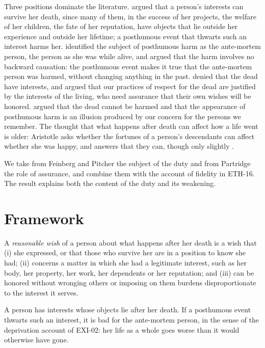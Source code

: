 \documentclass{situationist-preprint}
\begin{document}
Three positions dominate the literature. \citet[ch.~2]{Feinberg1984} argued that a person's interests can survive her death, since many of them, in the success of her projects, the welfare of her children, the fate of her reputation, have objects that lie outside her experience and outside her lifetime; a posthumous event that thwarts such an interest harms her. \citet{Pitcher1984} identified the subject of posthumous harm as the ante-mortem person, the person as she was while alive, and argued that the harm involves no backward causation: the posthumous event makes it true that the ante-mortem person was harmed, without changing anything in the past. \citet{Partridge1981} denied that the dead have interests, and argued that our practices of respect for the dead are justified by the interests of the living, who need assurance that their own wishes will be honored. \citet{Callahan1987} argued that the dead cannot be harmed and that the appearance of posthumous harm is an illusion produced by our concern for the persons we remember. The thought that what happens after death can affect how a life went is older: Aristotle asks whether the fortunes of a person's descendants can affect whether she was happy, and answers that they can, though only slightly \citep[I.10--11]{AristotleNE}.

We take from Feinberg and Pitcher the subject of the duty and from Partridge the role of assurance, and combine them with the account of fidelity in ETH-16. The result explains both the content of the duty and its weakening.

\section{Framework}

\begin{definition}\label{d:wish}
A \emph{reasonable wish} of a person about what happens after her death is a wish that (i) she expressed, or that those who survive her are in a position to know she had; (ii) concerns a matter in which she had a legitimate interest, such as her body, her property, her work, her dependents or her reputation; and (iii) can be honored without wronging others or imposing on them burdens disproportionate to the interest it serves.
\end{definition}

\begin{principle}\label{p:surv}
A person has interests whose objects lie after her death. If a posthumous event thwarts such an interest, it is bad for the ante-mortem person, in the sense of the deprivation account of EXI-02: her life as a whole goes worse than it would otherwise have gone.
\end{principle}
\end{document}
